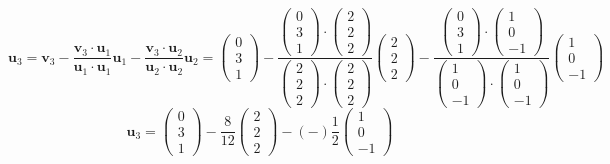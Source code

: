 \documentclass[a3paper,12pt]{extarticle} %
\begin{document}
\begin{enumerate}
\begin{enumerate}
\[            \mathbf{u}_3 = \mathbf{v}_3 - \frac{\mathbf{v}_3 \cdot \mathbf{u}_1}{\mathbf{u}_1 \cdot \mathbf{u}_1} \mathbf{u}_1 - \frac{\mathbf{v}_3 \cdot \mathbf{u}_2}{\mathbf{u}_2 \cdot \mathbf{u}_2} \mathbf{u}_2 = \begin{pmatrix} 0 \\ 3 \\ 1 \end{pmatrix} - \frac{\begin{pmatrix} 0 \\ 3 \\ 1 \end{pmatrix} \cdot \begin{pmatrix} 2 \\ 2 \\ 2 \end{pmatrix}}{\begin{pmatrix} 2 \\ 2 \\ 2 \end{pmatrix} \cdot \begin{pmatrix} 2 \\ 2 \\ 2 \end{pmatrix}} \begin{pmatrix} 2 \\ 2 \\ 2 \end{pmatrix} - \frac{\begin{pmatrix} 0 \\ 3 \\ 1 \end{pmatrix} \cdot \begin{pmatrix} 1 \\ 0 \\ -1 \end{pmatrix}}{\begin{pmatrix} 1 \\ 0 \\ -1 \end{pmatrix} \cdot \begin{pmatrix} 1 \\ 0 \\ -1 \end{pmatrix}} \begin{pmatrix} 1 \\ 0 \\ -1 \end{pmatrix}
        \]
        \[
            \mathbf{u}_3 = \begin{pmatrix} 0 \\ 3 \\ 1 \end{pmatrix} - \frac{8}{12} \begin{pmatrix} 2 \\ 2 \\ 2 \end{pmatrix} - (-)\frac{1}{2} \begin{pmatrix} 1 \\ 0 \\ -1 \end{pmatrix}
\]
\end{enumerate}
\end{enumerate}
\end{document}

